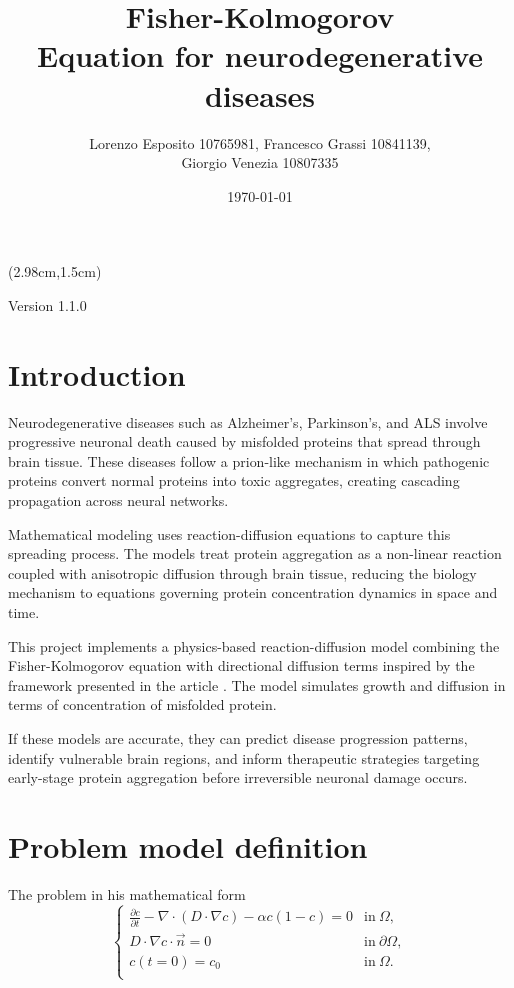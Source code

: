 \documentclass[12pt, a4paper, twoside, openright]{report}
\title{\textbf{Fisher-Kolmogorov}\\Equation for neurodegenerative diseases}
\author{Lorenzo Esposito 10765981, Francesco Grassi 10841139, \\Giorgio Venezia 10807335}
\date{\today}
\begin{document}
\begin{textblock*}{\textwidth}(2.98cm,1.5cm)
  \begin{center}
    \maketitle
    Version 1.1.0
  \end{center}
\end{textblock*}


\blankpage

\tableofcontents
\afterpage{\blankpage}
\newpage
{}

\chapter{Introduction}

Neurodegenerative diseases such as Alzheimer's, Parkinson's, and ALS involve progressive neuronal death caused by misfolded proteins that spread through brain tissue. These diseases follow a prion-like mechanism in which pathogenic proteins convert normal proteins into toxic aggregates, creating cascading propagation across neural networks.

Mathematical modeling uses reaction-diffusion equations to capture this spreading process. The models treat protein aggregation as a non-linear reaction coupled with anisotropic diffusion through brain tissue, reducing the biology mechanism to equations governing protein concentration dynamics in space and time.

This project implements a physics-based reaction-diffusion model combining the Fisher-Kolmogorov equation with directional diffusion terms inspired by the framework presented in the article \cite{WEICKENMEIER2019264}. The model simulates growth and diffusion in terms of concentration of misfolded protein.

If these models are accurate, they can predict disease progression patterns, identify vulnerable brain regions, and inform therapeutic strategies targeting early-stage protein aggregation before irreversible neuronal damage occurs.



\chapter{Problem model definition}
The problem in his mathematical form
\begin{equation} \label{fisher-kolmogorov}
\begin{cases}
\displaystyle
\frac{\partial c}{\partial t} - \nabla \cdot (D \cdot \nabla c) - \alpha c(1-c) = 0 & \textrm{in} \ \Omega ,\\

\displaystyle
D \cdot \nabla c \cdot \vec{n} = 0 &  \textrm{in} \ \partial \Omega,  \\

\displaystyle 
c(t=0)=c_{0} &  \textrm{in} \ \Omega.\\

\end{cases}
\end{equation}
\end{document}

